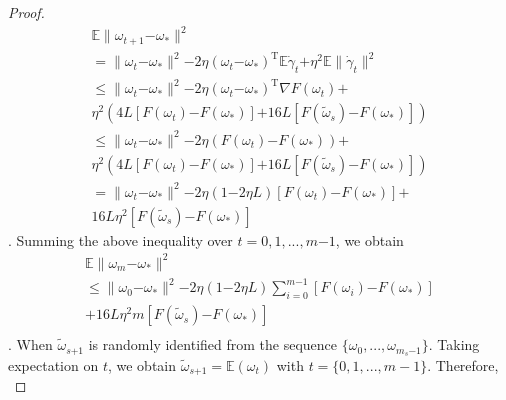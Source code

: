 \documentclass[letterpaper]{article}
\begin{document}
\begin{proof}
\begin{equation}
\begin{array}{ll}
\mathbb{E}\parallel  \omega_{t+1}\mathrm{-}\omega_\ast \parallel^2\\
=\parallel  \omega_{t}\mathrm{-}\omega_\ast  \parallel^2  \mathrm{-}2\eta(\omega_t\mathrm{-}\omega_\ast)^\mathrm{T}\mathbb{E}\dot{\gamma}_{t}  \mathrm{+}  \eta^2 \mathbb{E}\parallel  \dot{\gamma}_{t}  \parallel^2  \\
\le \parallel  \omega_{t}\mathrm{-}\omega_\ast  \parallel^2  \mathrm{-}2\eta(\omega_t\mathrm{-}\omega_\ast)^\mathrm{T}\nabla F(\omega_t) \mathrm{+} \\
\eta^2 \left(  4L [F(\omega_t)\mathrm{-}F(\omega_\ast)] \mathrm{+} 16 L [F(\tilde{\omega}_s)\mathrm{-}F(\omega_\ast)] \right)  \\ 
\le \parallel  \omega_{t}\mathrm{-}\omega_\ast  \parallel^2  \mathrm{-}2\eta( F(\omega_t) \mathrm{-} F(\omega_\ast) ) \mathrm{+} \\
\eta^2 \left(  4L [F(\omega_t)\mathrm{-}F(\omega_\ast)] \mathrm{+} 16 L[F(\tilde{\omega}_s)\mathrm{-}F(\omega_\ast)]\right)  \\ 
= \parallel  \omega_{t}\mathrm{-}\omega_\ast  \parallel^2  \mathrm{-}2\eta(1\mathrm{-}2\eta L) [F(\omega_t) \mathrm{-} F(\omega_\ast) ] \mathrm{+} \\
16 L \eta^2 [F(\tilde{\omega}_s)\mathrm{-}F(\omega_\ast)]
\end{array} 
\end{equation}. Summing the above inequality over $t={0,1, ..., m\mathrm{-}1}$, we obtain
\begin{equation}
\begin{array}{ll}
\mathbb{E}\parallel  \omega_{m}\mathrm{-}\omega_\ast \parallel^2  \\
\le \parallel  \omega_{0}\mathrm{-}\omega_\ast  \parallel^2  \mathrm{-}2\eta(1\mathrm{-}2\eta L) \sum\limits_{i=0}^{m\mathrm{-}1} [F(\omega_i) \mathrm{-} F(\omega_\ast) ]  \\
\mathrm{+}16 L \eta^2 m [F(\tilde{\omega}_s)\mathrm{-}F(\omega_\ast)]\\ 
\end{array} 
\end{equation}. When $\tilde{\omega}_{s\mathrm{+}1}$ is randomly identified from the sequence   $\{ \omega_0, ...,  \omega_{m_{s}\mathrm{-}1}   \}$. Taking expectation on $t$, we obtain $\tilde{\omega}_{s\mathrm{+}1}  = \mathbb{E} (\omega_t)$ with $t=\{0,1, ..., m-1   \}$. Therefore, 
\begin{equation}

\end{equation}
\end{proof}
\end{document}

